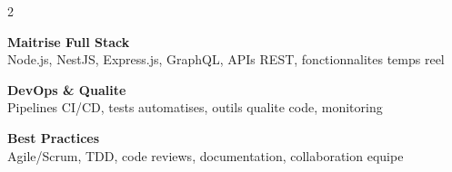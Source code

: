 \documentclass[10pt,a4paper]{article}
\begin{document}
\begin{multicols}{2}
{\vspace{3pt}
\textbf{Maitrise Full Stack}\\[1pt]
Node.js, NestJS, Express.js, GraphQL, APIs REST, fonctionnalites temps reel

\vspace{3pt}
\textbf{DevOps \& Qualite}\\[1pt]
Pipelines CI/CD, tests automatises, outils qualite code, monitoring

\vspace{3pt}
\textbf{Best Practices}\\[1pt]
Agile/Scrum, TDD, code reviews, documentation, collaboration equipe
}

\end{multicols}
\end{document}
